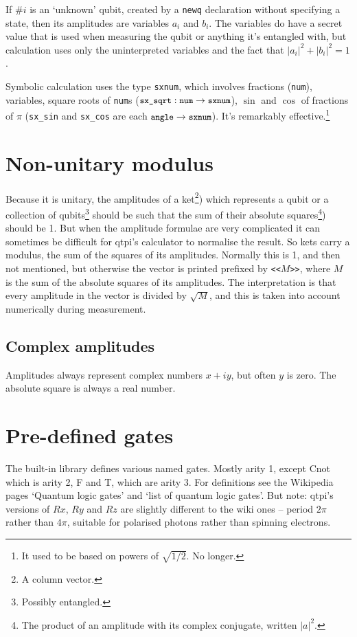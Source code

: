 \documentclass[11pt,a4paper]{book}
\newcommand{\verbtt}[1]{\texttt{\small{}#1}}
\begin{document}
If $\#i${} is an `unknown' qubit, created by a \verbtt{newq} declaration without specifying a state, then its amplitudes are variables $a_{i}$ and $b_{i}$. The variables do have a secret value that is used when measuring the qubit or anything it's entangled with, but calculation uses only the uninterpreted variables and the fact that $|a_{i}|^{2}+|b_{i}|^{2}=1$.

Symbolic calculation uses the type \verbtt{sxnum}, which involves fractions (\verbtt{num}), variables, square roots of \verbtt{num}s ($\verbtt{sx\_sqrt}: \verbtt{num}->\verbtt{sxnum}$), $\sin$ and $\cos$ of fractions of $\pi$ (\verbtt{sx\_sin} and \verbtt{sx\_cos} are each $\verbtt{angle}->\verbtt{sxnum}$). It's remarkably effective.\footnote{It used to be based on powers of $\sqrt{1/2}$. No longer.}

\section{Non-unitary modulus}

Because it is unitary, the amplitudes of a ket\footnote{A column vector.}) which represents a qubit or a collection of qubits\footnote{Possibly entangled.} should be such that the sum of their absolute squares\footnote{The product of an amplitude with its complex conjugate, written $|a|^{2}$.}) should be 1. But when the amplitude formulae are very complicated it can sometimes be difficult for qtpi's calculator to normalise the result. So kets carry a modulus, the sum of the squares of its amplitudes. Normally this is 1, and then not mentioned, but otherwise the vector is printed prefixed by \verbtt{<<}$M$\verbtt{>>}, where $M$ is the sum of the absolute squares of its amplitudes. The interpretation is that every amplitude in the vector is divided by $\sqrt{M}$, and this is taken into account numerically during measurement.

\subsection{Complex amplitudes}

Amplitudes always represent complex numbers $x+iy$, but often $y$ is zero. The absolute square is always a real number.

\section{Pre-defined gates}

The built-in library defines various named gates. Mostly arity 1, except Cnot which is arity 2, F and T, which are arity 3. For definitions see the Wikipedia pages `Quantum logic gates' and `list of quantum logic gates'. But note: qtpi's versions of $Rx$, $Ry$ and $Rz$ are slightly different to the wiki ones -- period $2\pi$ rather than $4\pi$, suitable for polarised photons rather than spinning electrons. 
\end{document}
